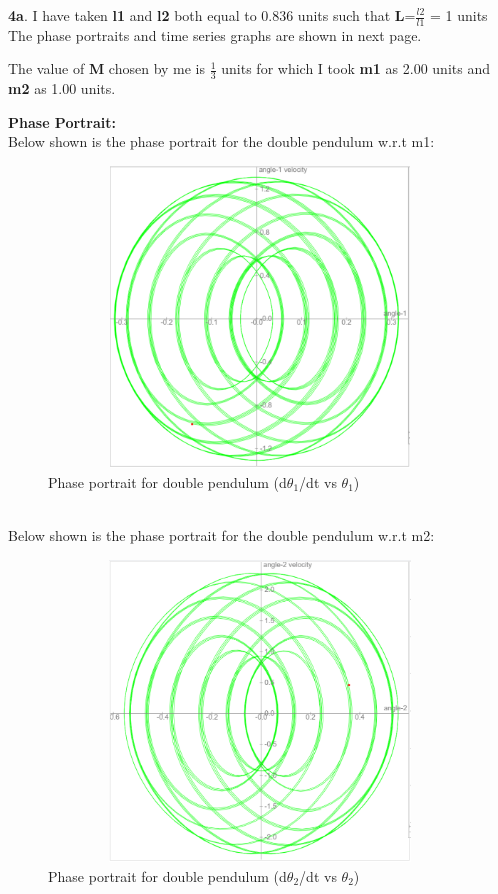 \documentclass[11pt]{scrartcl} %
\begin{document}
\textbf{4a}.
I have taken \textbf{l1} and \textbf{l2} both equal to 0.836 units such that \textbf{L}=$\frac{l2}{l1}$ = 1 units\\

The phase portraits and time series graphs are shown in next page.

The value of \textbf{M} chosen by me is $\frac{1}{3}$ units for which I took \textbf{m1} as 2.00 units and \textbf{m2} as 1.00 units.\newpage

\textbf{Phase Portrait:}\\
Below shown is the phase portrait for the double pendulum w.r.t m1:
\begin{figure}[h] %
	\centering
	\includegraphics[width=12cm, height=8cm]{4a_phase(1).PNG} %
	\caption{Phase portrait for double pendulum (d$\theta_{1}$/dt vs $\theta_{1}$)}
\end{figure}
\\
Below shown is the phase portrait for the double pendulum w.r.t m2:
\begin{figure}[h] %
	\centering
	\includegraphics[width=12cm, height=8cm]{4a_phase(2).PNG} %
	\caption{Phase portrait for double pendulum (d$\theta_{2}$/dt vs $\theta_{2}$)}
\end{figure}
\end{document}
